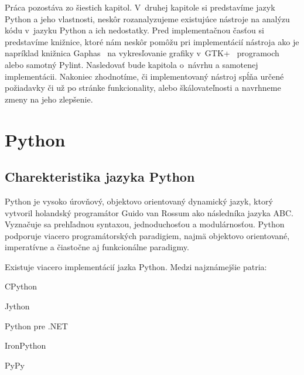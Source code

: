 \documentclass[11pt,oneside,final]{fithesis2}
\begin{document}
	Práca pozostáva zo šiestich kapitol. V~druhej kapitole si predstavíme jazyk Python a jeho vlastnosti, neskôr rozanalyzujeme existujúce nástroje na analýzu kódu v~jazyku Python a ich nedostatky. Pred implementačnou časťou si predstavíme knižnice, ktoré nám neskôr pomôžu pri implementácií nástroja ako je napríklad knižnica Gaphas~\cite{gaphas} na vykresľovanie grafiky v~GTK+~\cite{gtkplus} programoch alebo samotný Pylint. Nasledovať bude kapitola o~návrhu a samotenej implementácii. Nakoniec zhodnotíme, či implementovaný nástroj spĺňa určené požiadavky či už po stránke funkcionality, alebo škálovateľnosti a navrhneme zmeny na jeho zlepšenie.
 


%
%
%

\chapter{Python}

	\section{Charekteristika jazyka Python}
	Python je vysoko úrovňový, objektovo orientovaný dynamický jazyk, ktorý vytvoril holandský programátor Guido van Rossum ako následníka jazyka ABC.
Vyznačuje sa prehľadnou syntaxou, jednoduchosťou a modulárnosťou. Python podporuje viacero programátorských paradigiem, najmä objektovo orientované, imperatívne a čiastočne aj funkcionálne paradigmy.

Existuje viacero implementácií jazka Python. Medzi najznámejšie patria:
\begin{list}{•}{}
\item CPython
\item Jython
\item Python pre .NET
\item IronPython
\item PyPy
\end{list}
\end{document}
